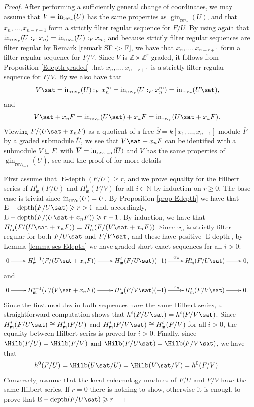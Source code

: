 \documentclass[12pt]{amsart}
\theoremstyle{definition}
\theoremstyle{definition}
\newcommand{\m}{\mathfrak{m}}
\def\NZQ{\mathbb}               %
\def\NN{{\NZQ N}}
\def\ZZ{{\NZQ Z}}
\newcommand{\ov}[1]{\overline{{#1}}}
\renewcommand{\geq}{\geqslant}
\let\ov\overline
\DeclareMathOperator{\Edepth}{E-depth}
\DeclareMathOperator{\rev}{rev}
\DeclareMathOperator{\gin}{gin}
\begin{document}
\begin{proof}
After performing a sufficiently general change of coordinates, we may assume that $V={\rm in}_{\rev_r}(U)$ has the same properties as $\gin_{\rev_r}(U)$, and that $x_n,\ldots,x_{n-r+1}$ form a strictly filter regular sequence for $F/U$. By using again that ${\rm in}_{\rev_r}(U:_Fx_n) = {\rm in}_{\rev_r}(U):_F x_n$, and because strictly filter regular sequences are filter regular by Remark \ref{remark SF -> F}, we have that  $x_n,\ldots,x_{n-r+1}$ form a filter regular sequence for $F/V$. Since $V$ is $\ZZ \times \ZZ^r$-graded, it follows from Proposition \ref{Edepth graded} that $x_n,\ldots,x_{n-r+1}$ is a strictly filter regular sequence for $F/V$. By \cite[15.7]{Eis95} we also have that
\[
V\sat = {\rm in}_{\rev_r}(U):_F x_n^\infty = {\rm in}_{\rev_r}(U:_F x_n^\infty) = {\rm in}_{\rev_r}(U\sat),
\]
and 
\[
V\sat+x_nF = {\rm in}_{\rev_r}(U\sat) + x_nF = {\rm in}_{\rev_r}(U\sat+x_nF).
\]
Viewing $F/(U\sat+x_nF)$ as a quotient of a free $\ov{S}=k[x_1,\ldots,x_{n-1}]$-module $\ov{F}$ by a graded submodule $\ov{U}$, we see that $V\sat+x_nF$ can be identified with a submodule $\ov{V} \subseteq \ov{F}$, with $\ov{V} = {\rm in}_{\rev_{r-1}}(\ov{U})$ and $\ov{V}$ has the same properties of $\gin_{\rev_{t-1}}(\ov{U})$, see \cite[Lemma 3.4]{CD21} and the proof of \cite[Theorem 3.6]{CD21} for more details.

First assume that $\Edepth(F/U) \geq r$, and we prove equality for the Hilbert series of $H^i_\m(F/U)$ and $H^i_\m(F/V)$ for all $i \in \NN$ by induction on $r \geq 0$. The base case is trivial since ${\rm in}_{\rev_0}(U) = U$. By Proposition \ref{prop Edepth} we have that $\Edepth(F/U\sat) \geq r > 0$ and, accordingly,   $\Edepth(F/(U\sat + x_nF)) \geq r-1$. By induction, we have that $H^i_\m(F/(U\sat+x_nF)) = H^i_\m(F/(V\sat+x_nF))$. Since $x_n$ is strictly filter regular for both $F/U\sat$ and $F/V\sat$, and these have positive $\Edepth$, by Lemma \ref{lemma ses Edepth} we have graded short exact sequences for all $i>0$:
\begin{equation}
\label{eq1}
\xymatrix{
0 \ar[r] & H^{i-1}_\m(F/(U\sat+x_nF)) \ar[r] & H^i_\m(F/U\sat)(-1) \ar[r]^-{\cdot x_n} & H^i_\m(F/U\sat) \ar[r] & 0,
}
\end{equation}
and
\begin{equation}
\label{eq2}
\xymatrix{
0 \ar[r] & H^{i-1}_\m(F/(V\sat+x_nF)) \ar[r] & H^i_\m(F/V\sat)(-1) \ar[r]^-{\cdot x_n} & H^i_\m(F/V\sat) \ar[r] & 0.
}
\end{equation}
Since the first modules in both sequences have the same Hilbert series, a straightforward computation shows that $h^i(F/U\sat) = h^i(F/V\sat)$. Since $H^i_\m(F/U\sat) \cong H^i_\m(F/U)$ and $H^i_\m(F/V\sat) \cong H^i_\m(F/V)$ for all $i>0$, the equality between Hilbert series is proved for $i>0$. Finally, since $\Hilb(F/U) = \Hilb(F/V)$ and $\Hilb(F/U\sat) = \Hilb(F/V\sat)$, we have that
\[
h^0(F/U) = \Hilb(U\sat/U) = \Hilb(V\sat/V) = h^0(F/V).
\]
Conversely, assume that the local cohomology modules of $F/U$ and $F/V$ have the same Hilbert series. If $r=0$ there is nothing to show, otherwise it is enough to prove that $\Edepth(F/U\sat) \geq r$.


\end{proof}
\end{document}
